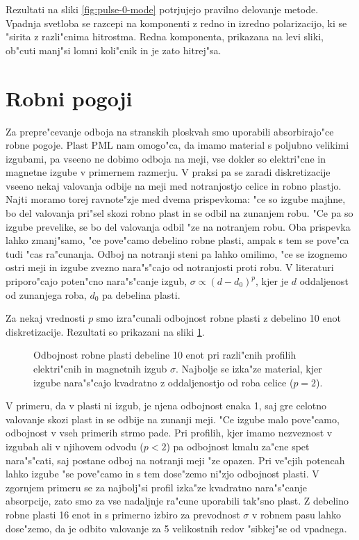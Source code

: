 \documentclass[12pt,twoside,openright,final]{report}
\begin{document}
Rezultati na sliki \ref{fig:pulse-0-mode} potrjujejo pravilno delovanje metode. 
Vpadnja svetloba se razcepi na komponenti z redno in izredno polarizacijo, ki se "sirita z razli"cnima hitrostma. 
Redna komponenta, prikazana na levi sliki, ob"cuti manj"si lomni koli"cnik in je zato hitrej"sa. 

\section{Robni pogoji}
Za prepre"cevanje odboja na stranskih ploskvah smo uporabili absorbirajo"ce robne pogoje. 
Plast \acs{PML} nam omogo"ca, da imamo material s poljubno velikimi izgubami, pa vseeno ne dobimo odboja na meji, vse dokler so elektri"cne in magnetne izgube v primernem razmerju. 
V praksi pa se zaradi diskretizacije vseeno nekaj valovanja odbije na meji med notranjostjo celice in robno plastjo. 
Najti moramo torej ravnote"zje med dvema prispevkoma: "ce so izgube majhne, bo del valovanja pri"sel skozi robno plast in se odbil na zunanjem robu. 
"Ce pa so izgube prevelike, se bo del valovanja odbil "ze na notranjem robu. 
Oba prispevka lahko zmanj"samo, "ce pove"camo debelino robne plasti, ampak s tem se pove"ca tudi "cas ra"cunanja. 
Odboj na notranji steni pa lahko omilimo, "ce se izognemo ostri meji in izgube zvezno nara"s"cajo od notranjosti proti robu. 
V literaturi\cite{taflove} priporo"cajo poten"cno nara"s"canje izgub, $\sigma \propto (d-d_0)^{p}$, kjer je $d$ oddaljenost od zunanjega roba, $d_0$ pa debelina plasti. 

Za nekaj vrednosti $p$ smo izra"cunali odbojnost robne plasti z debelino 10 enot diskretizacije. 
Rezultati so prikazani na sliki \ref{fig:test-absorption}. 

\begin{figure}[!htbp]
 
 \caption{Odbojnost robne plasti debeline 10 enot pri razli"cnih profilih elektri"cnih in magnetnih izgub $\sigma$. Najbolje se izka"ze material, kjer izgube nara"s"cajo kvadratno z oddaljenostjo od roba celice ($p=2$).}
 \label{fig:test-absorption}
\end{figure}

V primeru, da v plasti ni izgub, je njena odbojnost enaka 1, saj gre celotno valovanje skozi plast in se odbije na zunanji meji. 
"Ce izgube malo pove"camo, odbojnost v vseh primerih strmo pade. 
Pri profilih, kjer imamo nezveznost v izgubah ali v njihovem odvodu ($p<2$) pa odbojnost kmalu za"cne spet nara"s"cati, saj postane odboj na notranji meji "ze opazen.
Pri ve"cjih potencah lahko izgube "se pove"camo in s tem dose"zemo ni"zjo odbojnost plasti. 
V zgornjem primeru se za najbolj"si profil izka"ze kvadratno nara"s"canje absorpcije, zato smo za vse nadaljnje ra"cune uporabili tak"sno plast. 
Z debelino robne plasti 16 enot in s primerno izbiro za prevodnost $\sigma$ v robnem pasu lahko dose"zemo, da je odbito valovanje za 5 velikostnih redov "sibkej"se od vpadnega. 
\end{document}
